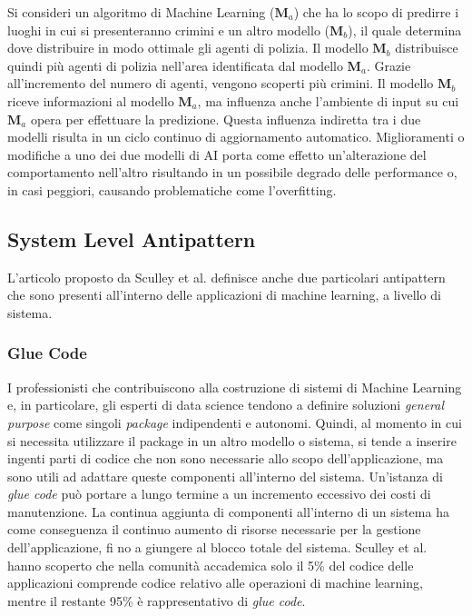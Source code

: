 Si consideri un algoritmo di Machine Learning ($\mathbf{M}_{a}$) che ha lo scopo di predirre i luoghi in cui si presenteranno crimini e un altro modello ($\mathbf{M}_{b}$), il quale determina dove distribuire in modo ottimale gli agenti di polizia. 
Il modello $\mathbf{M}_{b}$ distribuisce quindi più agenti di polizia nell'area identificata dal modello $\mathbf{M}_{a}$. Grazie all'incremento del numero di agenti, vengono scoperti più crimini. Il modello $\mathbf{M}_{b}$ riceve informazioni al modello $\mathbf{M}_{a}$, ma influenza anche l'ambiente di input su cui $\mathbf{M}_{a}$ opera per effettuare la predizione. Questa influenza indiretta tra i due modelli risulta in un ciclo continuo di aggiornamento automatico.
Miglioramenti o modifiche a uno dei due modelli di AI porta come effetto un'alterazione del comportamento nell'altro risultando in un possibile degrado delle performance o, in casi peggiori, causando problematiche come l'overfitting.


\subsection{System Level Antipattern}

L'articolo proposto da Sculley et al. \cite{sculley2015hidden} definisce anche due particolari antipattern che sono presenti all'interno delle applicazioni di machine learning, a livello di sistema.


\subsubsection{Glue Code}
I professionisti che contribuiscono alla costruzione di sistemi di Machine Learning e, in particolare, gli esperti di data science tendono a definire soluzioni \textit{general purpose} come singoli \textit{package} indipendenti e autonomi. Quindi, al momento in cui si necessita utilizzare il package in un altro modello o sistema, si tende a inserire ingenti parti di codice che non sono necessarie allo scopo dell'applicazione, ma sono utili ad adattare queste componenti all'interno del sistema.
Un'istanza di \textit{glue code} può portare a lungo termine a un incremento eccessivo dei costi di manutenzione. La continua aggiunta di componenti all'interno di un sistema ha come conseguenza il continuo aumento di risorse necessarie per la gestione dell'applicazione, fi no a giungere al blocco totale del sistema.
Sculley et al. \cite{sculley2015hidden} hanno scoperto che nella comunità accademica solo il 5\% del codice delle applicazioni comprende codice relativo alle operazioni di machine learning, mentre il restante 95\% è rappresentativo di \textit{glue code}.



